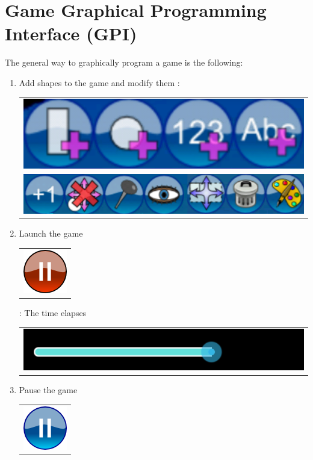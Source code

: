 \documentclass[12pt]{article} %
\begin{document}
\section{Game Graphical Programming Interface (GPI)}

The general way to graphically program a game is the following:

\begin{enumerate}
 \item Add shapes to the game and modify them :
 \begin{tabular}{l}\includegraphics[scale=0.2]{captures/shapesAdd} \\
 \includegraphics[scale=0.2]{captures/menu}\end{tabular}
 \item Launch the game \begin{tabular}{l}\label{launchGame}
 \includegraphics[scale=0.04]{captures/timebutton2}\end{tabular}: The time elapses
  \begin{tabular}{l}\includegraphics[scale=0.2]{captures/timebar}\end{tabular}
 \item Pause the game
 \begin{tabular}{l}\includegraphics[scale=0.04]{captures/timebutton}\end{tabular}

\end{enumerate}
\end{document}
